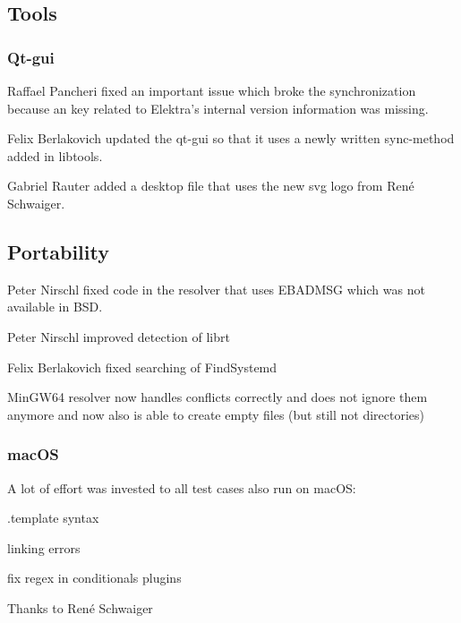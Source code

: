 \subsection*{Tools}

\subsubsection*{Qt-\/gui}

Raffael Pancheri fixed an important issue which broke the synchronization because an key related to Elektra’s internal version information was missing.

Felix Berlakovich updated the qt-\/gui so that it uses a newly written sync-\/method added in libtools.

Gabriel Rauter added a desktop file that uses the new svg logo from René Schwaiger.

\subsection*{Portability}


\begin{DoxyItemize}
\item Peter Nirschl fixed code in the resolver that uses E\+B\+A\+D\+M\+SG which was not available in B\+SD.
\item Peter Nirschl improved detection of librt
\item Felix Berlakovich fixed searching of Find\+Systemd
\item Min\+G\+W64 resolver now handles conflicts correctly and does not ignore them anymore and now also is able to create empty files (but still not directories)
\end{DoxyItemize}

\subsubsection*{mac\+OS}

A lot of effort was invested to all test cases also run on mac\+OS\+:


\begin{DoxyItemize}
\item .template syntax
\item linking errors
\item fix regex in conditionals plugins
\end{DoxyItemize}

Thanks to René Schwaiger

